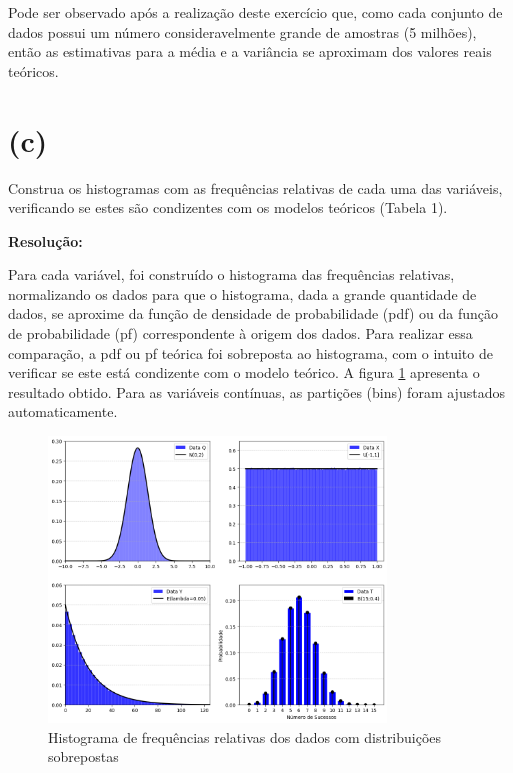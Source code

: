 \documentclass[]{abntex2}
\begin{document}
Pode ser observado após a realização deste exercício que, como cada conjunto de dados possui um número consideravelmente grande de amostras (5 milhões), então as estimativas para a média e a variância se aproximam dos valores reais teóricos.

\section*{\textbf{(c)}}

\noindent Construa os histogramas com as frequências relativas de cada uma das variáveis,
verificando se estes são condizentes com os modelos teóricos (Tabela 1).

\textbf{Resolução:}

Para cada variável, foi construído o histograma das frequências relativas, normalizando os dados para que o histograma, dada a grande quantidade de dados, se aproxime da função de densidade de probabilidade (pdf) ou da função de probabilidade (pf) correspondente à origem dos dados. Para realizar essa comparação, a pdf ou pf teórica foi sobreposta ao histograma, com o intuito de verificar se este está condizente com o modelo teórico. A figura \ref{fig:hist} apresenta o resultado obtido. Para as variáveis contínuas, as partições (bins) foram ajustados automaticamente.

\begin{figure}
    \centering 
    \includegraphics[width=0.8\textwidth]{imgs/hist.png}
    \caption{Histograma de frequências relativas dos dados com distribuições sobrepostas}
    \label{fig:hist} %
\end{figure}
\end{document}
